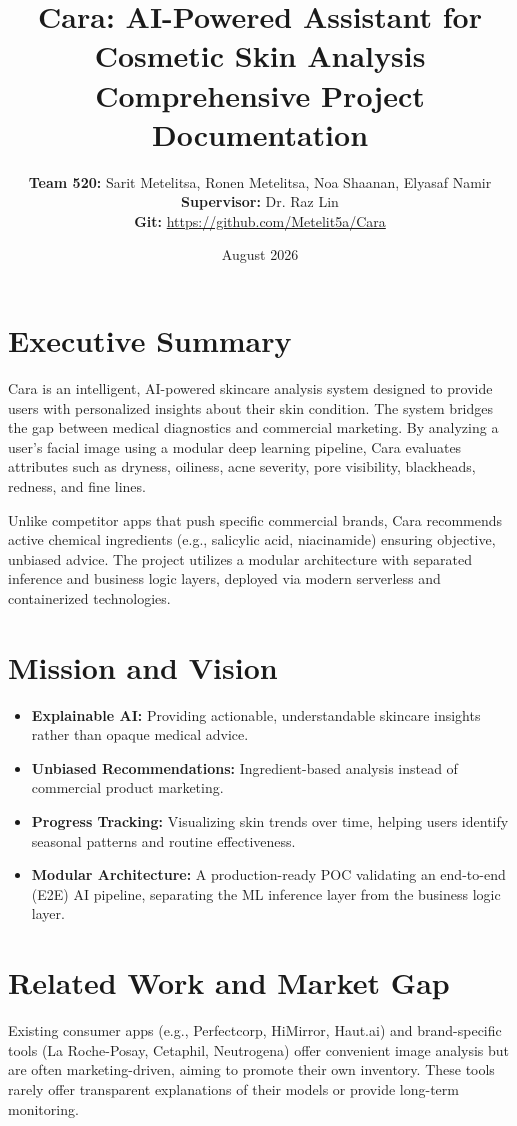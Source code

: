 \documentclass[12pt,a4paper]{article}
\title{\textbf{Cara: AI-Powered Assistant for Cosmetic Skin Analysis}\\ \Large Comprehensive Project Documentation}
\author{\textbf{Team 520:} Sarit Metelitsa, Ronen Metelitsa, Noa Shaanan, Elyasaf Namir \\ \textbf{Supervisor:} Dr. Raz Lin \\ \textbf{Git:} \url{https://github.com/Metelit5a/Cara}}
\date{August 2026}
\begin{document}
\maketitle
\tableofcontents
\newpage

\section{Executive Summary}
Cara is an intelligent, AI-powered skincare analysis system designed to provide users with personalized insights about their skin condition. The system bridges the gap between medical diagnostics and commercial marketing. By analyzing a user's facial image using a modular deep learning pipeline, Cara evaluates attributes such as dryness, oiliness, acne severity, pore visibility, blackheads, redness, and fine lines. 

Unlike competitor apps that push specific commercial brands, Cara recommends active chemical ingredients (e.g., salicylic acid, niacinamide) ensuring objective, unbiased advice. The project utilizes a modular architecture with separated inference and business logic layers, deployed via modern serverless and containerized technologies.

\section{Mission and Vision}
\begin{itemize}
    \item \textbf{Explainable AI:} Providing actionable, understandable skincare insights rather than opaque medical advice.
    \item \textbf{Unbiased Recommendations:} Ingredient-based analysis instead of commercial product marketing.
    \item \textbf{Progress Tracking:} Visualizing skin trends over time, helping users identify seasonal patterns and routine effectiveness.
    \item \textbf{Modular Architecture:} A production-ready POC validating an end-to-end (E2E) AI pipeline, separating the ML inference layer from the business logic layer.
\end{itemize}

\section{Related Work and Market Gap}
Existing consumer apps (e.g., Perfectcorp, HiMirror, Haut.ai) and brand-specific tools (La Roche-Posay, Cetaphil, Neutrogena) offer convenient image analysis but are often marketing-driven, aiming to promote their own inventory. These tools rarely offer transparent explanations of their models or provide long-term monitoring. 
\end{document}
